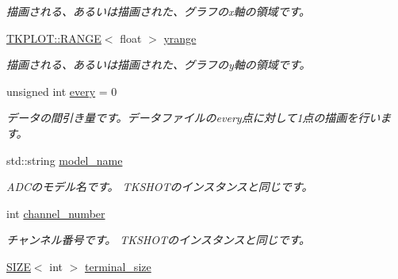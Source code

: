 \begin{DoxyCompactItemize}
\begin{DoxyCompactList}\small\item\em 描画される、あるいは描画された、グラフのx軸の領域です。 \end{DoxyCompactList}\item 
\mbox{\label{class_t_k_p_l_o_t_1_1_p_l_o_t_i_n_f_o_a5ce7809252eb582e3fae0a554bcdb65d}} 
\hyperlink{class_t_k_p_l_o_t_1_1_r_a_n_g_e}{T\+K\+P\+L\+O\+T\+::\+R\+A\+N\+GE}$<$ float $>$ \hyperlink{class_t_k_p_l_o_t_1_1_p_l_o_t_i_n_f_o_a5ce7809252eb582e3fae0a554bcdb65d}{yrange}
\begin{DoxyCompactList}\small\item\em 描画される、あるいは描画された、グラフのy軸の領域です。 \end{DoxyCompactList}\item 
\mbox{\label{class_t_k_p_l_o_t_1_1_p_l_o_t_i_n_f_o_a9b6c85908a1a6d8ab8371ea75aec8902}} 
unsigned int \hyperlink{class_t_k_p_l_o_t_1_1_p_l_o_t_i_n_f_o_a9b6c85908a1a6d8ab8371ea75aec8902}{every} = 0
\begin{DoxyCompactList}\small\item\em データの間引き量です。データファイルのevery点に対して1点の描画を行います。 \end{DoxyCompactList}\item 
std\+::string \hyperlink{class_t_k_p_l_o_t_1_1_p_l_o_t_i_n_f_o_ae98bf84fdf14074b4f7804f0617aa902}{model\+\_\+name}
\begin{DoxyCompactList}\small\item\em A\+D\+Cのモデル名です。 T\+K\+S\+H\+O\+Tのインスタンスと同じです。 \end{DoxyCompactList}\item 
int \hyperlink{class_t_k_p_l_o_t_1_1_p_l_o_t_i_n_f_o_a801d16eb357241d4f4eeef8c6393bbc4}{channel\+\_\+number}
\begin{DoxyCompactList}\small\item\em チャンネル番号です。 T\+K\+S\+H\+O\+Tのインスタンスと同じです。 \end{DoxyCompactList}\item 
\mbox{\label{class_t_k_p_l_o_t_1_1_p_l_o_t_i_n_f_o_afe6df040b952e6ab1e234d17de6023d0}} 
\hyperlink{class_t_k_p_l_o_t_1_1_s_i_z_e}{S\+I\+ZE}$<$ int $>$ \hyperlink{class_t_k_p_l_o_t_1_1_p_l_o_t_i_n_f_o_afe6df040b952e6ab1e234d17de6023d0}{terminal\+\_\+size}

\end{DoxyCompactItemize}
